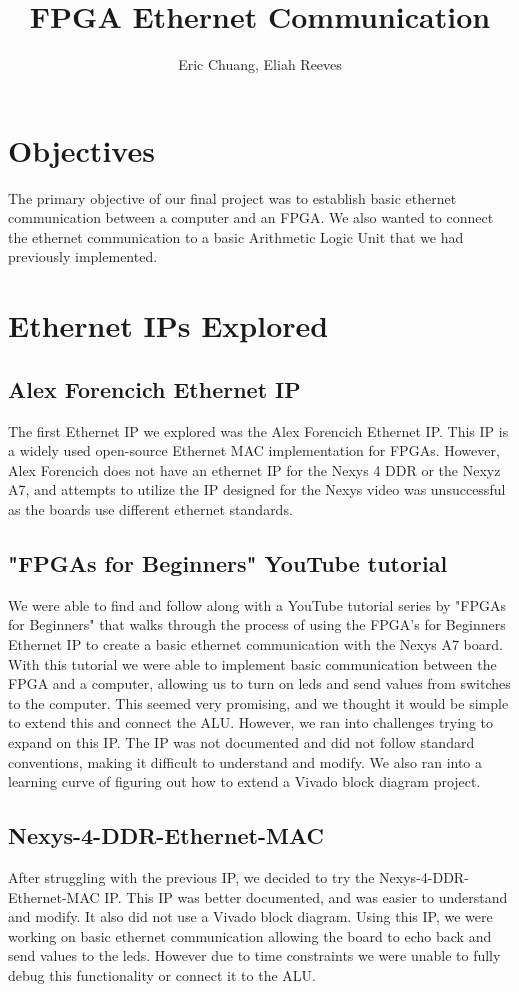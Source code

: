 \documentclass{article}
\title{FPGA Ethernet Communication}
\author{{Eric Chuang, Eliah Reeves}}
\date{\vspace{-5ex}} %
\begin{document}
\maketitle
\thispagestyle{firstpage}
\section*{Objectives}

The primary objective of our final project was to establish basic ethernet communication between a computer and an FPGA. We also wanted to connect the ethernet communication to a basic Arithmetic Logic Unit that we had previously implemented.

\section*{Ethernet IPs Explored}

\subsection*{Alex Forencich Ethernet IP}

The first Ethernet IP we explored was the Alex Forencich Ethernet IP. This IP is a widely used open-source Ethernet MAC implementation for FPGAs. However, Alex Forencich does not have an ethernet IP for the Nexys 4 DDR or the Nexyz A7, and attempts to utilize the IP designed for the Nexys video was unsuccessful as the boards use different ethernet standards.

\subsection*{"FPGAs for Beginners" YouTube tutorial}

We were able to find and follow along with a YouTube tutorial series by "FPGAs for Beginners" that walks through the process of using the FPGA's for Beginners Ethernet IP to create a basic ethernet communication with the Nexys A7 board. With this tutorial we were able to implement basic communication between the FPGA and a computer, allowing us to turn on leds and send values from switches to the computer. This seemed very promising, and we thought it would be simple to extend this and connect the ALU. However, we ran into challenges trying to expand on this IP. The IP was not documented and did not follow standard conventions, making it difficult to understand and modify. We also ran into a learning curve of figuring out how to extend a Vivado block diagram project.

\subsection*{Nexys-4-DDR-Ethernet-MAC}

After struggling with the previous IP, we decided to try the Nexys-4-DDR-Ethernet-MAC IP. This IP was better documented, and was easier to understand and modify. It also did not use a Vivado block diagram. Using this IP, we were working on basic ethernet communication allowing the board to echo back and send values to the leds. However due to time constraints we were unable to fully debug this functionality or connect it to the ALU.
\end{document}
